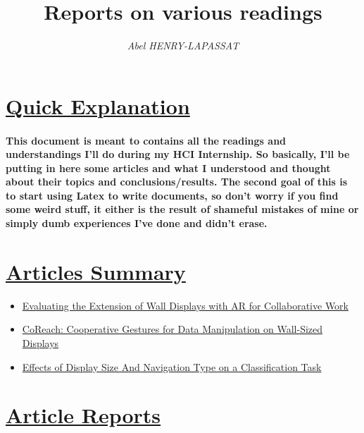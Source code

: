 \documentclass{article}
\title{\textbf{Reports on various readings}}
\author{\textit{Abel HENRY-LAPASSAT}}
\begin{document}
\maketitle
\section*{\underline{Quick Explanation}}
    \paragraph{ \textnormal{This document is meant to contains all the readings and understandings I'll do during my HCI Internship.
        So basically, I'll be putting in here some articles and what I understood and thought about their topics and conclusions/results.
        The second goal of this is to start using Latex to write documents, so don't worry if you find some weird stuff, it either is the
        result of shameful mistakes of mine or simply dumb experiences I've done and didn't erase. } }

\section*{\underline{Articles Summary}}
    \begin{itemize}
        \item \href{https://hal.science/hal-04010673/document}{Evaluating the Extension of Wall Displays with AR for Collaborative Work} \dotfill \pageref{sec:james2023}
        \item \href{https://hal.science/hal-01437091/document}{CoReach: Cooperative Gestures for Data Manipulation on Wall-Sized Displays} \dotfill \pageref{sec:liu2017}
        \item \href{https://hal.science/file/index/docid/957269/filename/chi14-classify-hal-v1.pdf}{Effects of Display Size And Navigation Type on a Classification Task} \dotfill \pageref{sec:liu2014}
    \end{itemize}

\section*{\underline{Article Reports}}

    \label{sec:james2023}
    
    \newpage 

    \label{sec:liu2017}
    
    \newpage

    \label{sec:liu2014}
    
\end{document}
